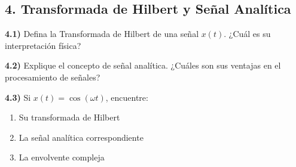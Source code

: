 \subsection*{4. Transformada de Hilbert y Señal Analítica}

\textbf{4.1)} Defina la Transformada de Hilbert de una señal \(x(t)\). ¿Cuál es su interpretación física?

\textbf{4.2)} Explique el concepto de señal analítica. ¿Cuáles son sus ventajas en el procesamiento de señales?

\textbf{4.3)} Si \(x(t) = \cos(\omega t)\), encuentre:
\begin{enumerate}[label=\alph*)]
    \item Su transformada de Hilbert
    \item La señal analítica correspondiente
    \item La envolvente compleja
\end{enumerate}

